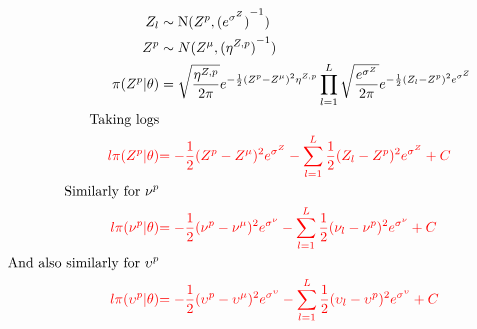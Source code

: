 \begin{align*}
Z_{l} &\sim \operatorname{N}(Z^{p},{(e^{\sigma^{Z}})}^{-1})\\
Z^{p} &\sim N(Z^{\mu},{(\eta^{Z,p})}^{-1}) \\
\pi(Z^{p}|\theta)&=\sqrt{\frac{\eta^{Z,p}}{2\pi}} e^{-\frac{1}{2}(Z^{p}-Z^{\mu})^{2}\eta^{Z,p} }
\prod_{l=1}^{L}\sqrt{\frac{e^{\sigma^{Z}}}{2\pi}} e^{-\frac{1}{2}(Z_{l}-Z^{p})^{2}e^{\sigma^{Z}} }\\
\text{Taking logs}\\
\color{red}{l\pi(Z^{p}|\theta)}&
\color{red}{
=-\frac{1}{2}(Z^{p}-Z^{\mu})^{2}e^{\sigma^{Z}}
-
\sum_{l=1}^{L}\frac{1}{2}(Z_{l}-Z^{p})^{2}e^{\sigma^{Z}}
+C
}\\
\text{Similarly for $\nu^p$}\\
\color{red}{l\pi(\nu^p|\theta)}&
\color{red}{
=-\frac{1}{2}(\nu^{p}-\nu^{\mu})^{2}e^{\sigma^{\nu}}
-
\sum_{l=1}^{L}\frac{1}{2}(\nu_{l}-\nu^{p})^{2}e^{\sigma^{\nu}}
+C
}\\
\text{And also similarly for $\upsilon^p$}\\
\color{red}{l\pi(\upsilon^p|\theta)}&
\color{red}{
=-\frac{1}{2}(\upsilon^{p}-\upsilon^{\mu})^{2}e^{\sigma^{\upsilon}}
-
\sum_{l=1}^{L}\frac{1}{2}(\upsilon_{l}-\upsilon^{p})^{2}e^{\sigma^{\upsilon}}
+C
}
\end{align*}